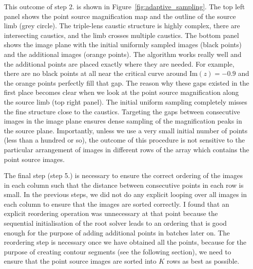 \documentclass[12pt,dvipsnames]{report}
\begin{document}
This outcome of step 2. is shown in Figure~\ref{fig:adaptive_sampling}. 
The top left panel shows
the point source magnification map and the outline of the source limb (grey circle). The triple-lens
caustic structure is highly complex, there are intersecting caustics, and the limb 
crosses multiple caustics. The bottom panel shows the image plane with the initial uniformly 
sampled images (black points) and the additional images (orange points). The algorithm 
works really well and the additional points are placed exactly where they are needed. 
For example, there are no black points at all near the critical curve  around 
$\mathrm{Im}(z)=-0.9$ and the orange points perfectly fill that gap. The reason why these 
gaps existed in the first place becomes clear when we look at the  point source magnification 
along the source limb (top right panel). The initial uniform sampling 
completely misses the fine structure close  to the caustics. Targeting the gaps between 
consecutive images in the image plane ensures 
dense sampling of the magnification peaks in the source plane. 
Importantly, unless we use a very small initial number of points (less than a hundred or so), 
the outcome of this procedure is 
not sensitive  to the particular arrangement of images in different rows of the array
which contains the point source images.

The final step (step 5.) is necessary to ensure the correct ordering of the images in each column 
such that the distance between consecutive points in each row is small. 
In the previous steps, we did not do any explicit looping over all images in each column to 
ensure that the images are sorted correctly. I found that an explicit reordering operation was 
unnecessary at that point because the sequential initialisation of the root solver leads to 
an ordering that is good enough for the purpose of adding additional points in batches later on. 
The reordering step is necessary once we have obtained all the points,
because for the purpose of creating contour segments (see the following section), 
we need to ensure that the point source images are sorted into $K$ rows as best as possible. 
\end{document}
